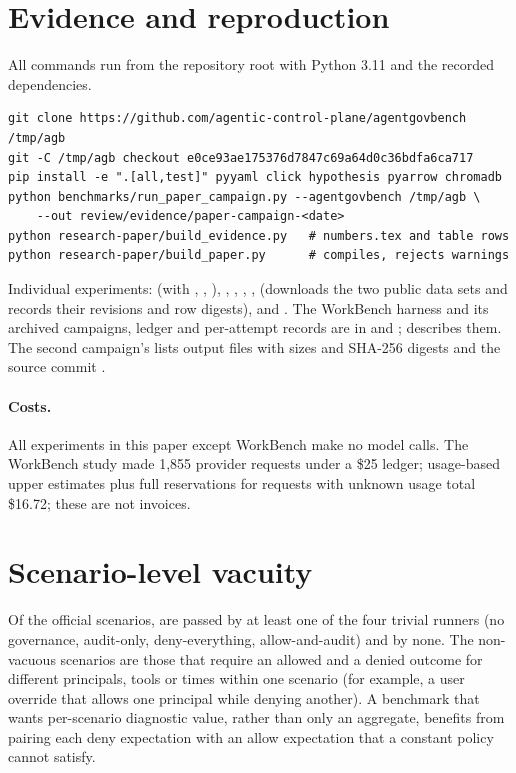 \section{Evidence and reproduction}
\label{app:repro}
All commands run from the repository root with Python 3.11 and the recorded dependencies.
\begin{verbatim}
git clone https://github.com/agentic-control-plane/agentgovbench /tmp/agb
git -C /tmp/agb checkout e0ce93ae175376d7847c69a64d0c36bdfa6ca717
pip install -e ".[all,test]" pyyaml click hypothesis pyarrow chromadb
python benchmarks/run_paper_campaign.py --agentgovbench /tmp/agb \
    --out review/evidence/paper-campaign-<date>
python research-paper/build_evidence.py   # numbers.tex and table rows
python research-paper/build_paper.py      # compiles, rejects warnings
\end{verbatim}
Individual experiments:  (with , , ), , , , ,  (downloads the two public data sets and records their revisions and row digests), and . The WorkBench harness and its archived campaigns, ledger and per-attempt records are in  and ;  describes them. The second campaign's  lists \CampaignFiles{} output files with sizes and SHA-256 digests and the source commit \code{\CampaignCommit{}}.

\paragraph{Costs.} All experiments in this paper except WorkBench make no model calls. The WorkBench study made 1{,}855 provider requests under a \$25 ledger; usage-based upper estimates plus full reservations for requests with unknown usage total \$16.72; these are not invoices.

\section{Scenario-level vacuity}
\label{app:vacuity}
Of the \AGBTotal{} official scenarios, \VacuousAny{} are passed by at least one of the four trivial runners (no governance, audit-only, deny-everything, allow-and-audit) and \VacuousNone{} by none. The non-vacuous scenarios are those that require an allowed and a denied outcome for different principals, tools or times within one scenario (for example, a user override that allows one principal while denying another). A benchmark that wants per-scenario diagnostic value, rather than only an aggregate, benefits from pairing each deny expectation with an allow expectation that a constant policy cannot satisfy.

